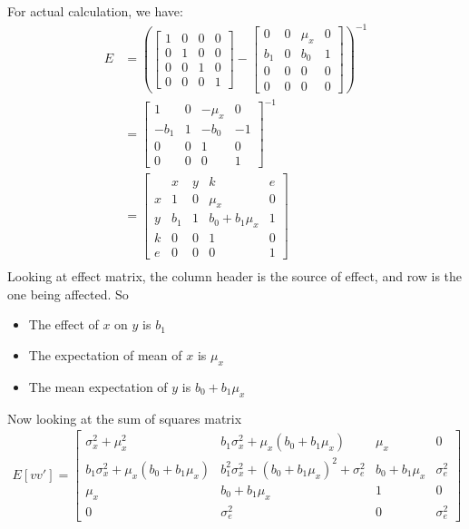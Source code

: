 For actual calculation, we have: 
\begin{align*}
    E 
    & = \left(
        \begin{bmatrix}
            1 & 0 & 0 & 0 \\
            0 & 1 & 0 & 0 \\
            0 & 0 & 1 & 0 \\
            0 & 0 & 0 & 1
        \end{bmatrix}
        - 
            \begin{bmatrix}
            0 & 0 & \mu_x & 0\\
            b_1 & 0 & b_0 & 1\\
            0 & 0 & 0 & 0\\
            0 & 0 & 0 & 0
        \end{bmatrix}
        \right)^{-1}\\
    & = 
        \begin{bmatrix}
            1 & 0 & -\mu_x & 0 \\
            -b_1 & 1 & -b_0 & -1 \\
            0 & 0 & 1 & 0 \\
            0 & 0 & 0 & 1
        \end{bmatrix}^{-1} \\
    & = 
        \begin{bmatrix}
              & x & y & k & e \\
            x & 1 & 0 & \mu_x & 0 \\
            y & b_1 & 1 & b_0 + b_1\mu_x & 1 \\
            k & 0 & 0 & 1 & 0 \\
            e & 0 & 0 & 0 & 1
        \end{bmatrix}\\
\end{align*}
Looking at effect matrix, the column header is the source of effect, and row is the one being affected. So
    \begin{itemize}
        \item The effect of $x$ on $y$ is $b_1$
        \item The expectation of mean of $x$ is $\mu_x$
        \item The mean expectation of $y$ is $b_0 + b_1\mu_x$
    \end{itemize}
Now looking at the sum of squares matrix 
    \begin{align*}
        E[vv'] = 
            \begin{bmatrix}
                \sigma_x^2 + \mu_x^2 &  b_1\sigma_x^2 + \mu_x(b_0 + b_1\mu_x) & \mu_x & 0 \\
                b_1\sigma_x^2 + \mu_x(b_0 + b_1\mu_x) & b_1^2\sigma_x^2 + (b_0 + b_1\mu_x)^2 + \sigma_e^2 & b_0 + b_1\mu_x & \sigma_e^2 \\
                \mu_x & b_0 + b_1\mu_x & 1 & 0 \\
                0 & \sigma_e^2 & 0 & \sigma_e^2
            \end{bmatrix}
    \end{align*}
